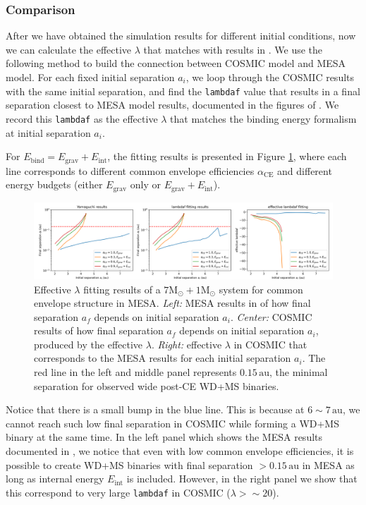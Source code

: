 \documentclass[12pt]{article}
\newcommand{\Msun}{\mathrm{M_{\odot}}}
\newcommand{\alphace}{\alpha_{\mathrm{CE}}}
\newcommand{\Ebind}{E_{\mathrm{bind}}}
\newcommand{\Egrav}{E_{\mathrm{grav}}}
\newcommand{\Eint}{E_{\mathrm{int}}}
\newcommand{\au}{\, \mathrm{au}}
\begin{document}
\subsubsection{Comparison}
After we have obtained the simulation results for different initial conditions, now we can calculate the effective $\lambda$ that matches with results in \cite{yamaguchi_hi}. We use the following method to build the connection between COSMIC model and MESA model. For each fixed initial separation $a_i$, we loop through the COSMIC results with the same initial separation, and find the \verb|lambdaf| value that results in a final separation closest to MESA model results, documented in the figures of \cite{yamaguchi_hi}. We record this \verb|lambdaf| as the effective $\lambda$ that matches the binding energy formalism at initial separation $a_i$.

For $\Ebind = \Egrav + \Eint$, the fitting results is presented in Figure \ref{fit_hi}, where each line corresponds to different common envelope efficiencies $\alphace$ and different energy budgets (either $\Egrav$ only or $\Egrav + \Eint$).

\begin{figure}
    \centering
    \includegraphics[width=1\linewidth]{7+1fit.png}
    \caption{Effective $\lambda$ fitting results of a $7\Msun + 1\Msun$ system for common envelope structure in MESA. \emph{Left:} MESA results in \cite{yamaguchi_hi} of how final separation $a_f$ depends on initial separation $a_i$. \emph{Center:} COSMIC results of how final separation $a_f$ depends on initial separation $a_i$, produced by the effective $\lambda$. \emph{Right:} effective $\lambda$ in COSMIC that corresponds to the MESA results for each initial separation $a_i$. The red line in the left and middle panel represents $0.15 \au$, the minimal separation for observed wide post-CE WD+MS binaries.}
    \label{fit_hi}
\end{figure}

Notice that there is a small bump in the blue line. This is because at $6 \sim 7 \au$, we cannot reach such low final separation in COSMIC while forming a WD+MS binary at the same time. In the left panel which shows the MESA results documented in \cite{yamaguchi_hi}, we notice that even with low common envelope efficiencies, it is possible to create WD+MS binaries with final separation $>0.15 \au$ in MESA as long as internal energy $\Eint$ is included. However, in the right panel we show that this correspond to very large \verb|lambdaf| in COSMIC ($\lambda > \sim 20$).
\end{document}

